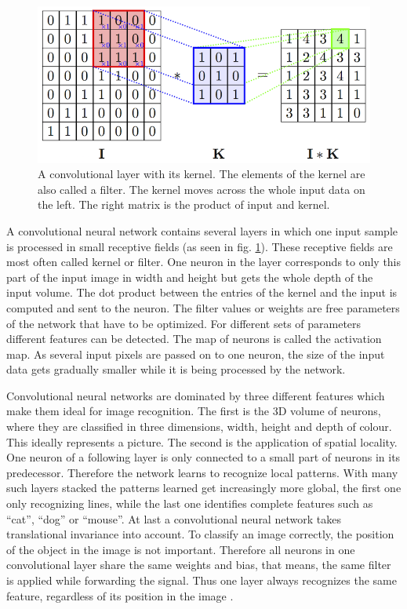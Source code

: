 \begin{figure}
\centering
\includegraphics[scale=1.5]{convolve.png}
\caption{A convolutional layer with its kernel. The elements of the kernel are also called a filter. The kernel moves across the whole input data on the left. The right matrix is the product of input and kernel. \cite{convwindow}}
\label{convwindow}
\end{figure}
A convolutional neural network contains several layers in which one input sample is processed in small receptive fields (as seen in fig. \ref{convwindow}). These receptive fields are most often called kernel or filter. One neuron in the layer corresponds to only this part of the input image in width and height but gets the whole depth of the input volume. The dot product between the entries of the kernel and the input is computed and sent to the neuron. The filter values or weights are free parameters of the network that have to be optimized. For different sets of parameters different features can be detected.
The map of neurons is called the activation map. As several input pixels are passed on to one neuron, the size of the input data gets gradually smaller while it is being processed by the network.

Convolutional neural networks are dominated by three different features which make them ideal for image recognition. The first is the 3D volume of neurons, where they are classified in three dimensions, width, height and depth of colour. This ideally represents a picture. The second is the application of spatial locality. One neuron of a following layer is only connected to a small part of neurons in its predecessor. Therefore the network learns to recognize local patterns. With many such layers stacked the patterns learned get increasingly more global, the first one only recognizing lines, while the last one identifies complete features such as \enquote{cat}, \enquote{dog} or \enquote{mouse}.
At last a convolutional neural network takes translational invariance into account. To classify an image correctly, the position of the object in the image is not important. Therefore all neurons in one convolutional layer share the same weights and bias, that means, the same filter is applied while forwarding the signal. Thus one layer always recognizes the same feature, regardless of its position in the image \cite{lecunimage}. 

